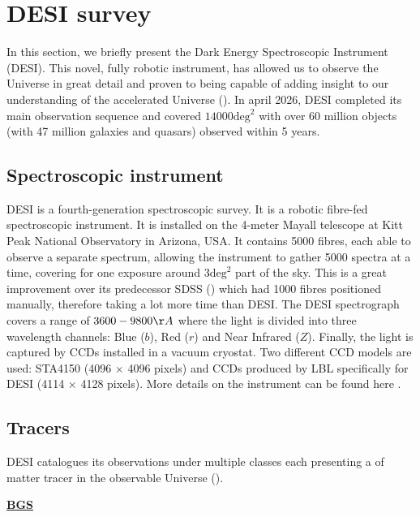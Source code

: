 
\section{DESI survey}

In this section, we briefly present the Dark Energy Spectroscopic Instrument (DESI). This novel, fully robotic instrument, has allowed us to observe the Universe in great detail and 
proven to being capable of adding insight to our understanding of the accelerated Universe (\cite{DESI_DR2_2025}). 
In april 2026, DESI completed its main observation sequence and covered $14000\text{deg}^2$ with over 60 million objects (with 47 million galaxies and quasars) observed within 5 years. \\

\subsection{Spectroscopic instrument}

DESI is a fourth-generation spectroscopic survey. It is a robotic fibre-fed spectroscopic instrument. 
It is installed on the 4-meter Mayall telescope at Kitt Peak National Observatory in Arizona, USA. 
It contains 5000 fibres, each able to observe a separate spectrum, allowing the instrument to gather 5000 spectra at a time, covering for one exposure around $3 \text{deg}^2$
part of the sky. This is a great improvement over its predecessor SDSS (\cite{Dawson_2016}) which had 1000 fibres positioned manually, therefore taking a lot more time than DESI. 
The DESI spectrograph covers a range of $3600-9800 \AA$ where the light is divided into three wavelength channels: Blue ($b$), Red ($r$) and Near Infrared ($Z$). Finally, the light 
is captured by CCDs installed in a vacuum cryostat. Two different CCD models are used: STA4150 (4096 $\times$ 4096 pixels) and CCDs produced by LBL specifically for DESI 
(4114 $\times$ 4128 pixels). More details on the instrument can be found here \cite{DESI_Instrument_2016}.\\

\subsection{Tracers}

DESI catalogues its observations under multiple classes each presenting a of matter tracer in the observable Universe (\cite{DESI_Design_2016}).

\noindent \textbf{\underline{BGS}} \\

